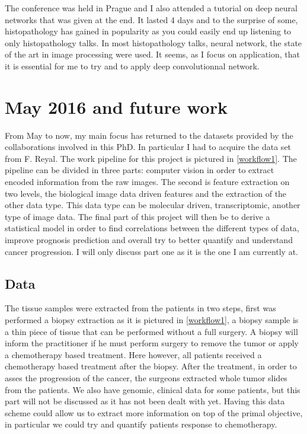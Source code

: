\documentclass[a4paper,10pt]{article}
\begin{document}
The conference was held in Prague and I also attended a tutorial on deep neural networks that was given at the end. It lasted 4 days and to the surprise of some, histopathology has gained in popularity as you could easily end up listening to only histopathology talks. In most histopathology talks, neural network, the state of the art in image processing were used. It seems, as I focus on application, that it is essential for me to try and to apply deep convolutionnal network.


\section{May 2016 and future work}
From May to now, my main focus has returned to the datasets provided by the collaborations involved in this PhD. In particular I had to acquire the data set from F. Reyal. The work pipeline for this project is pictured in \ref{workflow1}. The pipeline can be divided in three parts: computer vision in order to extract encoded information from the raw images. The second is feature extraction on two levels, the biological image data driven features and the extraction of the other data type. This data type can be molecular driven, transcriptomic, another type of image data. The final part of this project will then be to derive a statistical model in order to find correlations between the different types of data, improve prognosis prediction and overall try to better quantify and understand cancer progression. I will only discuss part one as it is the one I am currently at.


\subsection{Data}

The tissue samples were extracted from the patients in two steps, first was performed a biopsy extraction as it is pictured in \ref{workflow1}, a biopsy sample is a thin piece of tissue that can be performed without a full surgery. A biopsy will inform the practitioner if he must perform surgery to remove the tumor or apply a chemotherapy based treatment. Here however, all patients received a chemotherapy based treatment after the biopsy. After the treatment, in order to asses the progression of the cancer, the surgeons extracted whole tumor slides from the patients. We also have genomic, clinical data for some patients, but this part will not be discussed as it has not been dealt with yet. Having this data scheme could allow us to extract more information on top of the primal objective, in particular we could try and quantify patients response to chemotherapy.
\end{document}
